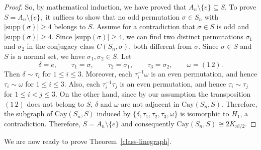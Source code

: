 \documentclass[12pt, a4paper]{article}
\theoremstyle{definition}
\begin{document}
\begin{proof}
So, by mathematical induction, we have proved that
\(
A_n\setminus\{e\}\subseteq S.
\)
To prove 
\(
S=A_n\setminus\{e\},
\)
it suffices to show that no odd permutation $\sigma\in S_n$ with $|\mathrm{supp}(\sigma)|\ge 4$ belongs to $S$. Assume for a contradiction that $\sigma\in S$ is odd and $|\mathrm{supp}(\sigma)|\ge 4$. Since $|\mathrm{supp}(\sigma)|\ge 4$, we can find two distinct permutations $\sigma_1$ and $\sigma_2$ in the conjugacy class $C(S_n,\sigma)$, both different from $\sigma$. Since $\sigma\in S$ and $S$ is a normal set, we have $\sigma_1, \sigma_2\in S$.
Let
\[
\delta=e,\qquad
\tau_1=\sigma,\qquad
\tau_2=\sigma_1,\qquad
\tau_3=\sigma_2,\qquad
\omega=(1\,2).
\]
Then $\delta\sim\tau_i$ for $1\le i\le 3$. Moreover, each $\tau_i^{-1}\omega$ is an even permutation, and hence $\tau_i\sim\omega$ for $1\le i\le 3$. Also, each $\tau_i^{-1}\tau_j$ is an even permutation, and hence $\tau_i\sim\tau_j$ for $1\le i<j\le 3$. On the other hand, since by our assumption the transposition $(1\,2)$ does not belong to $S$, $\delta$ and $\omega$ are not adjacent in $\mathrm{Cay}(S_n,S)$. Therefore, the subgraph of $\mathrm{Cay}(S_n,S)$ induced by $\{\delta,\tau_1,\tau_2,\tau_3,\omega\}$ is isomorphic to $H_1$, a contradiction. Therefore, 
\(
S=A_n\setminus\{e\}
\)
and consequently $\mathrm{Cay}(S_n,S) \cong 2 K_{n!/2}$. 
\end{proof}

We are now ready to prove Theorem~\ref{class-linegraph}.
\end{document}
